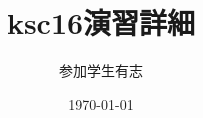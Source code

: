 \documentclass[dvipdfmx]{jsarticle}
\begin{document}
\title{ksc16演習詳細}
\author{参加学生有志}
\date{\today}
\begin{titlepage}
    \maketitle
\end{titlepage}




\end{document}
